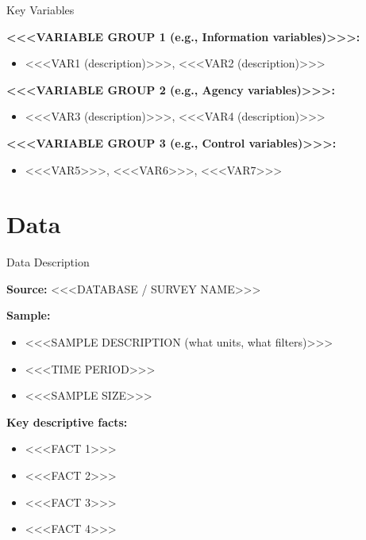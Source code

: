 \documentclass[aspectratio=169, 11pt]{beamer}
\begin{document}
\begin{frame}{Key Variables}

\textbf{<<<VARIABLE GROUP 1 (e.g., Information variables)>>>:}
\begin{itemize}
  \item <<<VAR1 (description)>>>, <<<VAR2 (description)>>>
\end{itemize}

\textbf{<<<VARIABLE GROUP 2 (e.g., Agency variables)>>>:}
\begin{itemize}
  \item <<<VAR3 (description)>>>, <<<VAR4 (description)>>>
\end{itemize}

\textbf{<<<VARIABLE GROUP 3 (e.g., Control variables)>>>:}
\begin{itemize}
  \item <<<VAR5>>>, <<<VAR6>>>, <<<VAR7>>>
\end{itemize}

\end{frame}

\section{Data}

\begin{frame}{Data Description}

\textbf{Source:} <<<DATABASE / SURVEY NAME>>>

\bigskip
\textbf{Sample:}
\begin{itemize}
  \item <<<SAMPLE DESCRIPTION (what units, what filters)>>>
  \item <<<TIME PERIOD>>>
  \item <<<SAMPLE SIZE>>>
\end{itemize}

\bigskip
\textbf{Key descriptive facts:}
\begin{itemize}
  \item <<<FACT 1>>>
  \item <<<FACT 2>>>
  \item <<<FACT 3>>>
  \item <<<FACT 4>>>
\end{itemize}

\end{frame}
\end{document}
